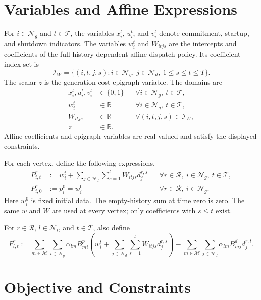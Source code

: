 \documentclass[11pt]{article}
\begin{document}
\section{Variables and Affine Expressions}

For $i\in\mathcal N_g$ and $t\in\mathcal T$, the variables $x_i^t$, $u_i^t$, and $v_i^t$ denote commitment, startup, and shutdown indicators. The variables $w_i^t$ and $W_{itjs}$ are the intercepts and coefficients of the full history-dependent affine dispatch policy. Its coefficient index set is
\[
\mathcal I_W=\{(i,t,j,s):i\in\mathcal N_g,\ j\in\mathcal N_d,
\ 1\le s\le t\le T\}.
\]
The scalar $z$ is the generation-cost epigraph variable. The domains are
\begin{align}
 x_i^t,u_i^t,v_i^t&\in\{0,1\}
 &&\forall i\in\mathcal N_g,\ t\in\mathcal T,\label{eq:binary}\\
 w_i^t&\in\mathbb R
 &&\forall i\in\mathcal N_g,\ t\in\mathcal T,\\
 W_{itjs}&\in\mathbb R
 &&\forall(i,t,j,s)\in\mathcal I_W,\\
 z&\in\mathbb R.
\end{align}
Affine coefficients and epigraph variables are real-valued and satisfy the displayed constraints.

For each vertex, define the following expressions.
\begin{align}
 P_{i,t}^r&:=w_i^t+
 \sum_{j\in\mathcal N_d}\sum_{s=1}^{t}W_{itjs}d_j^{r,s}
 &&\forall r\in\mathcal R,\ i\in\mathcal N_g,\ t\in\mathcal T,\label{eq:dispatch}\\
 P_{i,0}^r&:=p_i^0=w_i^0
 &&\forall r\in\mathcal R,\ i\in\mathcal N_g.\label{eq:initial}
\end{align}
Here $w_i^0$ is fixed initial data. The empty-history sum at time zero is zero. The same $w$ and $W$ are used at every vertex; only coefficients with $s\le t$ exist.

For $r\in\mathcal R$, $l\in\mathcal N_l$, and $t\in\mathcal T$, also define
\begin{equation}
 F_{l,t}^r:=
 \sum_{m\in\mathcal M}\sum_{i\in\mathcal N_g}
 \alpha_{lm}B^p_{mi}
 \left(w_i^t+\sum_{j\in\mathcal N_d}\sum_{s=1}^{t}
 W_{itjs}d_j^{r,s}\right)
 -\sum_{m\in\mathcal M}\sum_{j\in\mathcal N_d}
 \alpha_{lm}B^d_{mj}d_j^{r,t}.
 \label{eq:flow}
\end{equation}

\section{Objective and Constraints}
\end{document}
